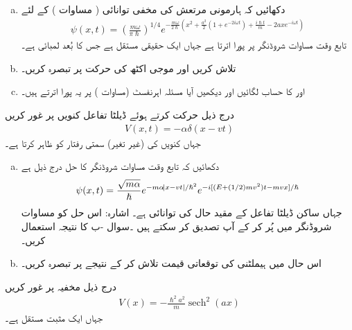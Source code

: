\begin{enumerate}[a.]
\item
 دکھائیں کہ ہارمونی مرتعش کی مخفی توانائی ( مساوات ) کے لئے
\begin{align*}
	\psi(x, t)=\left(\frac{m\omega}{\pi\hslash}\right)^{1/4}e^{-\frac{m\omega}{2\hslash}\left(x^2+\frac{a^2}{2}(1+e^{-2i\omega t})+\frac{i\hslash t}{m}-2axe^{-i\omega t}\right)}
\end{align*}
  تابع وقت مساوات شروڈنگر پر پورا اترتا ہے جہاں  ایک حقیقی مستقل ہے جس کا بُعد لمبائی ہے۔
\item
  تلاش کریں اور موجی اکٹھ کی حرکت پر تبصرہ کریں۔
\item
  اور  کا حساب لگائیں اور دیکھیں آیا مسئلہ اہرنفسٹ  (مساوات )  پر یہ پورا اترتے ہیں۔
\end{enumerate}
درج ذیل حرکت کرتے ہوئے ڈیلٹا تفاعل کنویں  پر غور کریں 
\begin{align*}
	V(x, t)=-\alpha\delta(x-v t)
\end{align*}
جہاں  کنویں  کی (غیر تغیر) سمتی رفتار کو   ظاہر کرتا ہے۔
\begin{enumerate}[a.]
\item
 دکھائیں کہ تابع وقت مساوات شروڈنگر کا حل درج ذیل ہے
\begin{align*}
	\psi(x, t)=\frac{\sqrt{m\alpha}}{\hslash}e^{-m\alpha\abs{x-v t}/\hslash^2}e^{-i[(E+(1/2)m v^2)t-m v x]/\hslash}
\end{align*}
جہاں  ساکن ڈیلٹا تفاعل کے مقید حال کی توانائی ہے۔ اشارہ: اس حل کو مساوات شروڈنگر میں پُر کر کے آپ تصدیق کر سکتے ہیں ۔سوال -ب کا نتیجہ استعمال کریں۔
\item
 اس حال میں ہیملٹنی کی توقعاتی قیمت تلاش کر کے نتیجے پر تبصرہ کریں۔
\end{enumerate}
درج ذیل مخفیہ پر غور کریں 
\begin{align*}
	V(x)=-\frac{\hslash^2a^2}{m}\operatorname{sech}^2(ax)
\end{align*}
جہاں  ایک مثبت مستقل ہے۔
